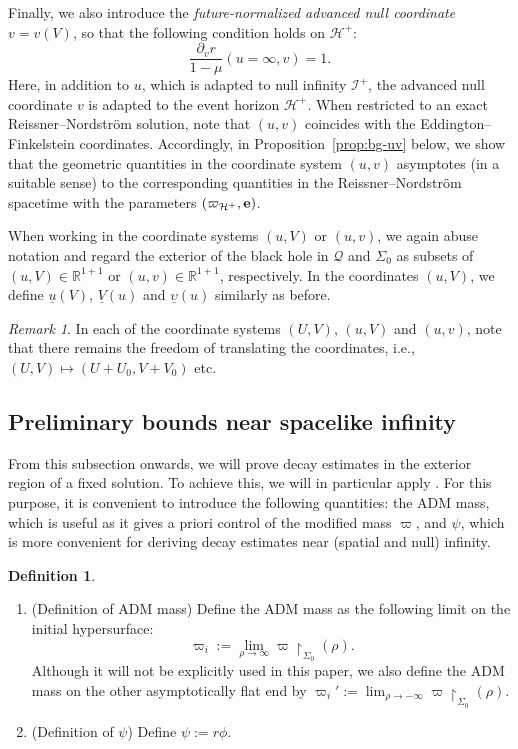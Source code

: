 \documentclass[10pt, reqno]{amsart}
\theoremstyle{definition}
\newtheorem{definition}[theorem]{Definition}
\theoremstyle{remark}
\newtheorem{remark}[theorem]{Remark}
\theoremstyle{conjecture}
\numberwithin{equation}{section}
\newcommand{\rd}{\partial}
\newcommand{\0}{\emptyset}
\newcommand{\Sgm}{\Sigma}
\newcommand{\ups}{\upsilon}
\newcommand{\bfe}{{\bf e}}
\newcommand{\bbR}{\mathbb R}
\newcommand{\calH}{\mathcal H}
\newcommand{\calI}{\mathcal I}
\newcommand{\calQ}{\mathcal Q}
\newcommand{\PD}{\calQ}
\newcommand{\EH}{\calH^{+}}
\newcommand{\e}{\bfe}							%
\newcommand{\NI}{\calI^{+}}						%
\begin{document}
Finally, we also introduce the \emph{future-normalized advanced null coordinate} $v = v(V)$, so that the following condition holds on $\EH$:
\begin{equation} \label{eq:coord-v-bg-0}
	\frac{\rd_{v} r}{1-\mu}(u=\infty, v) = 1.
\end{equation}
Here, in addition to $u$, which is adapted to null infinity $\NI$, the advanced null coordinate $v$ is adapted to the event horizon $\EH$. When restricted to an exact Reissner--Nordstr\"om solution, note that $(u, v)$ coincides with the Eddington--Finkelstein coordinates. Accordingly, in  Proposition~\ref{prop:bg-uv} below, we show that the geometric quantities in the coordinate system $(u, v)$ asymptotes (in a suitable sense) to the corresponding quantities in the Reissner--Nordstr\"om spacetime with the parameters $(\varpi_{\EH}, \e)$.

When working in the coordinate systems $(u, V)$ or $(u, v)$, we again abuse notation and regard the exterior of the black hole in $\PD$ and $\Sgm_{0}$ as subsets of $(u, V) \in \bbR^{1+1}$ or $(u, v) \in \bbR^{1+1}$, respectively. In the coordinates $(u, V)$, we define $\underline{u}(V)$, $\underline{V}(u)$ and $\underline{\ups}(u)$ similarly as before.

\begin{remark}  \label{rem:coord-trans}
In each of the coordinate systems $(U, V)$, $(u, V)$ and $(u, v)$, note that there remains the freedom of translating the coordinates, i.e., $(U, V) \mapsto (U + U_{0}, V  +V_{0})$ etc.
\end{remark}

\subsection{Preliminary bounds near spacelike infinity} \label{subsec:bg-large-r}

From this subsection onwards, we will prove decay estimates in the exterior region of a fixed solution. To achieve this, we will in particular apply \cite{DRPL}. For this purpose, it is convenient to introduce the following quantities: the ADM mass, which is useful as it gives a priori control of the modified mass $\varpi$, and $\psi$, which is more convenient for deriving decay estimates near (spatial and null) infinity.

\begin{definition}\label{def.ADM.psi}
\begin{enumerate}
\item (Definition of ADM mass) Define the ADM mass as the following limit on the initial hypersurface:
$$\varpi_i:=\lim_{\rho\to \infty} \varpi\restriction_{\Sigma_0}(\rho).$$
Although it will not be explicitly used in this paper, we also define the ADM mass on the other asymptotically flat end by $\varpi_i':=\lim_{\rho\to -\infty} \varpi\restriction_{\Sigma_0}(\rho).$
\item (Definition of $\psi$) Define $\psi:=r\phi$.
\end{enumerate}
\end{definition}
\end{document}
